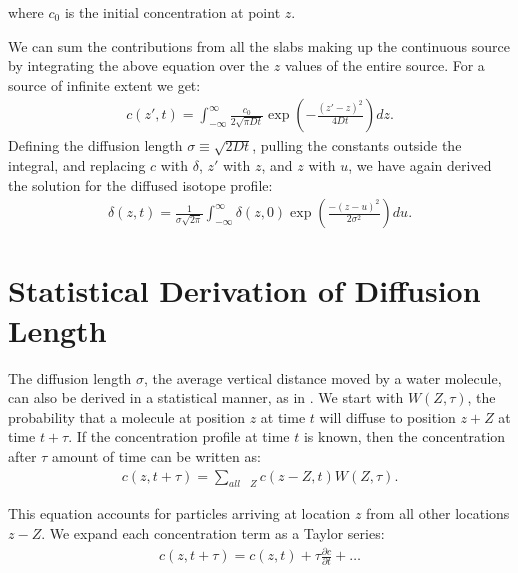 \documentclass[draft, jgrga]{AGUTeX}
\begin{document}
\begin{article}
where $c_0$ is the initial concentration at point $z$.

We can sum the contributions from all the slabs making up the continuous source by integrating the above equation over the $z$ values of the entire source. For a source of infinite extent we get:
\begin{eqnarray}
c(z',t) = \int^\infty_{-\infty} \frac{c_0}{2\sqrt{\pi Dt}}
\exp \left(-\frac{(z' -z)^2}{4Dt}\right) dz.
\end{eqnarray}
Defining the diffusion length $\sigma \equiv \sqrt{2Dt}$, pulling the constants outside the integral, and replacing $c$ with $\delta$, $z'$ with $z$, and $z$ with $u$, we have again derived the solution for the diffused isotope profile:
\begin{eqnarray}
\delta (z,t) = \frac{1}{\sigma \sqrt{2 \pi}}
\int^\infty_{-\infty} \delta (z,0) \exp \left(\frac{-(z-u)^2}{2 \sigma ^2} \right) du.
\end{eqnarray}


\section{Statistical Derivation of Diffusion Length}

The diffusion length $\sigma$, the average vertical distance moved by a water molecule, can also be derived in a statistical manner, as in \citet{Lasaga2014}. We start with $W(Z,\tau)$, the probability that a molecule at position $z$ at time $t$ will diffuse to position $z + Z$ at time $t + \tau$. If the concentration profile at time $t$ is known, then the concentration after $\tau$ amount of time can be written as:
\begin{eqnarray}
  \label{eq:concentration}
c(z, t + \tau) = \sum_{all \quad Z} c(z - Z, t) W(Z, \tau).
\end{eqnarray}

This equation accounts for particles arriving at location \begin{math} z \end{math} from all other locations \begin{math} z - Z \end{math}. We expand each concentration term as a Taylor series:
\begin{eqnarray}
c(z, t + \tau) = c(z,t)+ \tau \frac{\partial c}{\partial t} + \ldots
\end{eqnarray}


\end{article}
\end{document}
